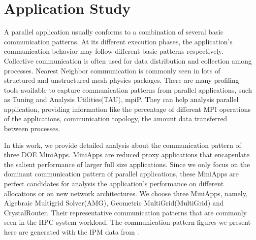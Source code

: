 \documentclass[conference]{IEEEtran}
\begin{document}
\section{Application Study}
\label{sec:application study}


A parallel application usually conforms to a combination of several basic communication patterns\cite{hpdc2015-ornl}. At its different execution phases, the application's communication behavior may follow different basic patterns respectively. Collective communication is often used for data distribution and collection among processes. Nearest Neighbor communication is commonly seen in lots of structured and unstructured mesh physics packages. There are many profiling tools available to capture communication patterns from parallel applications, such as Tuning and Analysis Utilities(TAU)\cite{tau}, mpiP\cite{mpip}. They can help analysis parallel application, providing information like the percentage of different MPI operations of the applications, communication topology, the amount data transferred between processes.

In this work, we provide detailed analysis about the communication pattern of three DOE MiniApps. MiniApps are reduced proxy applications that encapsulate the salient performance of larger full size applications\cite{miniapp}. Since we only focus on the dominant communication pattern of parallel applications, these MiniApps are perfect candidates for analysis the application's performance on different allocations or on new network architectures. We choose three MiniApps, namely, Algebraic Multigrid Solver(AMG), Geometric MultiGrid(MultiGrid) and CrystalRouter. Their representative communication patterns that are commonly seen in the HPC system workload. The communication pattern figures we present here are generated with the IPM\cite{ipm} data from \cite{design forward webpage}.
\end{document}
